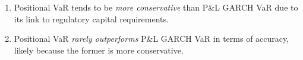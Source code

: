 \begin{mrkeybox}[title={Empirical findings of backtesting positional VaR vs P\&L GARCH VaR}]
\begin{enumerate}
\item {} Positional VaR tends to be \textit{more conservative} than P\&L GARCH
      VaR due to its link to regulatory capital requirements.
\item {} Positional VaR \textit{rarely outperforms} P\&L GARCH VaR in terms of
      accuracy, likely because the former is more conservative.
\end{enumerate}
\end{mrkeybox}


